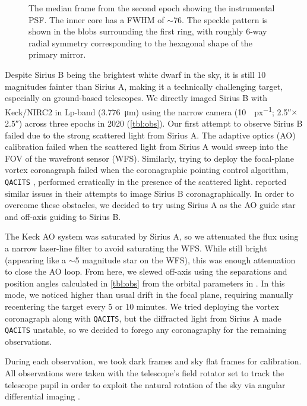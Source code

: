 \documentclass[twocolumn]{aastex631}
\begin{document}
\begin{figure}
    \centering
    \caption{The median frame from the second epoch showing the instrumental PSF. The inner core has a FWHM of $\sim$\qty{76}{\milliarcsecond}. The speckle pattern is shown in the blobs surrounding the first ring, with roughly 6-way radial symmetry corresponding to the hexagonal shape of the primary mirror.}
    \label{fig:psf}
\end{figure}

Despite Sirius B being the brightest white dwarf in the sky, it is still 10 magnitudes fainter than Sirius A, making it a technically challenging target, especially on ground-based telescopes. We directly imaged Sirius B with Keck/NIRC2 in Lp-band (\qty{3.776}{\micro\meter}) using the narrow camera (\qty{10}{\milliarcsecond\per px}; \ang{;;2.5}$\times$\ang{;;2.5}) across three epochs in 2020 (\autoref{tbl:obs}). Our first attempt to observe Sirius B failed due to the strong scattered light from Sirius A. The adaptive optics (AO) calibration failed when the scattered light from Sirius A would sweep into the FOV of the wavefront sensor (WFS). Similarly, trying to deploy the focal-plane vortex coronagraph \citep{serabyn_w_2017} failed when the coronagraphic pointing control algorithm, \texttt{QACITS} \citep{huby_w_2017}, performed erratically in the presence of the scattered light. \citet[\S2]{vigan_high-contrast_2015} reported similar issues in their attempts to image Sirius B coronagraphically. In order to overcome these obstacles, we decided to try using Sirius A as the AO guide star and off-axis guiding to Sirius B.

The Keck AO system \citep{wizinowich_performance_2000} was saturated by Sirius A, so we attenuated the flux using a narrow laser-line filter to avoid saturating the WFS. While still bright (appearing like a $\sim$5 magnitude star on the WFS), this was enough attenuation to close the AO loop. From here, we slewed off-axis using the separations and position angles calculated in \autoref{tbl:obs} from the orbital parameters in \citet{bond_sirius_2017}. In this mode, we noticed higher than usual drift in the focal plane, requiring manually recentering the target every 5 or 10 minutes. We tried deploying the vortex coronagraph along with \texttt{QACITS}, but the diffracted light from Sirius A made \texttt{QACITS} unstable, so we decided to forego any coronagraphy for the remaining observations.

During each observation, we took dark frames and sky flat frames for calibration. All observations were taken with the telescope's field rotator set to track the telescope pupil in order to exploit the natural rotation of the sky via angular differential imaging \citep[ADI;][]{marois_angular_2006}.
\end{document}
